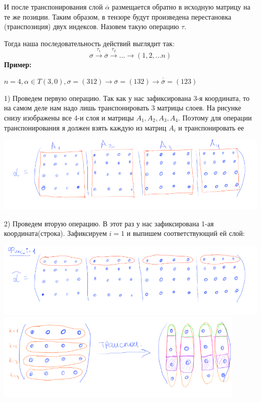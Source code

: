 И после транспонирования слой $\overline{\alpha}$ размещается обратно в исходную матрицу на те же позиции. Таким образом, в тензоре будут произведена перестановка (транспозиция) двух индексов. Назовем такую операцию $\tau$.

Тогда наша последовательность действий выглядит так: 
$$\sigma \xrightarrow{\tau_1}\overline{\sigma}\xrightarrow{\tau_2}\ldots \xrightarrow{} (1,2,\ldots n)$$
\textbf{Пример:}

$n = 4, \alpha \in T(3,0), \sigma = (3 12)\rightarrow \overline{\sigma} =  (132) \rightarrow \overline{\overline{\sigma }} = (123)$

1) Проведем первую операцию. Так как у нас зафиксирована 3-я координата, то на самом деле нам надо лишь транспонировать 3 матрицы слоев. На рисунке снизу изображены все 4-и слоя и матрицы $A_1,A_2,A_3,A_4$. Поэтому для операции транспонирования я должен взять каждую из матриц $A_i$ и транспонировать ее
\begin{center}
         \includegraphics[width = 18cm]{assets/8_4-sample-1.png}
 \end{center}
2) Проведем вторую операцию. В этот раз у нас зафиксирована 1-ая координата(строка). Зафиксируем $i=1$ и выпишем соответствующий ей слой:
\begin{center}
         \includegraphics[width = 18cm]{assets/8_4-sample-2.png}
         \includegraphics[width = 12cm]{assets/8_4-sample-3.png}
 \end{center}
